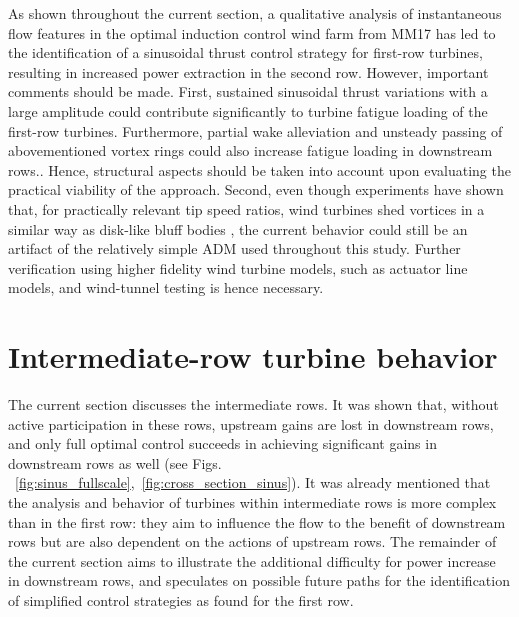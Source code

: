 \documentclass[wes, manuscript]{copernicus}
\newcommand{\revision}[1]{{\color{blue} #1}}
\begin{document}
As shown throughout the current section, a qualitative analysis of instantaneous flow features in the optimal induction control wind farm from MM17 has led to the identification of a sinusoidal thrust control strategy for first-row turbines, resulting in increased power extraction in the second row. However, important comments should be made. First, sustained sinusoidal thrust variations with a large amplitude could contribute significantly to turbine fatigue loading \revision{of the first-row turbines. Furthermore, partial wake alleviation and unsteady passing of abovementioned vortex rings could also increase fatigue loading in downstream rows.}. Hence, structural aspects should be taken into account upon evaluating the practical viability of the approach. Second, even though experiments have shown that, for practically relevant tip speed ratios, wind turbines shed vortices in a similar way as disk-like bluff bodies \citep{medici2006measurements}, the current behavior could still be an artifact of the relatively simple ADM used throughout this study. Further verification using higher fidelity wind turbine models, such as actuator line models, and wind-tunnel testing is hence necessary. 

\section{Intermediate-row turbine behavior}\label{sec:analysis_intermediate}
The current section discusses the intermediate rows. It was shown that, without active participation in these rows, upstream gains are lost in downstream rows, and only full optimal control succeeds in achieving significant gains in downstream rows as well (see Figs. ~\ref{fig:sinus_fullscale},~\ref{fig:cross_section_sinus}). It was already mentioned that the analysis and behavior of turbines within intermediate rows is more complex than in the first row: they aim to influence the flow to the benefit of downstream rows but are also dependent on the actions of upstream rows. The remainder of the current section aims to illustrate the additional difficulty for power increase in downstream rows, and speculates on possible future paths for the identification of simplified control strategies as found for the first row.
\end{document}
